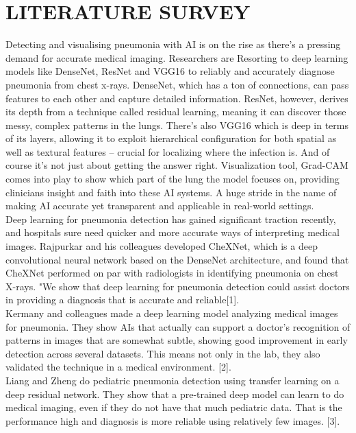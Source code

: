 \documentclass[conference]{IEEEtran}
\begin{document}
\section{\textbf{LITERATURE SURVEY}}
\hspace{0.5cm}Detecting and visualising pneumonia with AI is on the rise as there's a pressing demand for accurate medical imaging. Researchers are Resorting to deep learning models like DenseNet, ResNet and VGG16 to reliably and accurately diagnose pneumonia from chest x-rays. DenseNet, which has a ton of connections, can pass features to each other and capture detailed information. ResNet, however, derives its depth from a technique called residual learning, meaning it can discover those messy, complex patterns in the lungs. There's also VGG16 which is deep in terms of its layers, allowing it to exploit hierarchical configuration for both spatial as well as textural features – crucial for localizing where the infection is. And of course it's not just about getting the answer right. Visualization tool, Grad-CAM comes into play to show which part of the lung the model focuses on, providing clinicians insight and faith into these AI systems. A huge stride in the name of making AI accurate yet transparent and applicable in real-world settings.\\
Deep learning for pneumonia detection has gained significant traction recently, and hospitals sure need quicker and more accurate ways of interpreting medical images. Rajpurkar and his colleagues developed CheXNet, which is a deep convolutional neural network based on the DenseNet architecture, and found that CheXNet performed on par with radiologists in identifying pneumonia on chest X-rays. "We show that deep learning for pneumonia detection could assist doctors in providing a diagnosis that is accurate and reliable[1].\\
Kermany and colleagues made a deep learning model analyzing medical images for pneumonia. They show AIs that actually can support a doctor's recognition of patterns in images that are somewhat subtle, showing good improvement in early detection across several datasets. This means not only in the lab, they also validated the technique in a medical environment. [2].\\
Liang and Zheng do pediatric pneumonia detection using transfer learning on a deep residual network. They show that a pre-trained deep model can learn to do medical imaging, even if they do not have that much pediatric data. That is the performance high and diagnosis is more reliable using relatively few images. [3].\\
\end{document}

